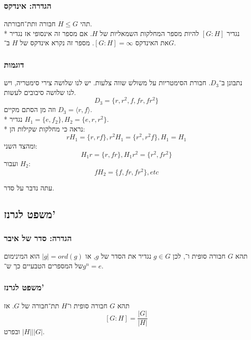 \subsubsection{הגדרה: אינדקס}
תהי $H \le G$ חבורה ותת־חבורתה. \\*
נגדיר $[G : H]$ להיות מספר המחלקות השמאליות של $H$.
אם מספר זה אינסופי אז נגדיר את האינדקס $[G : H] = \infty$.
מספר זה נקרא אינדקס של $H$ ב־$G$.

\subsubsection{דוגמות}
נתבונן ב־$D_3$.
חבורת הסימטריות על משולש שווה צלעות.
יש לנו שלושה צירי סימטריה, ויש לנו שלושה סיבובים לעשות.
\[
	D_3 = \{ r, r^2, f, fr, fr^2 \}
\]
וזה מן הסתם מקיים $D_3 = \langle r, f \rangle$. \\*
נגדיר $H_1 = \{e, f_2\}, H_2 = \{e, r, r^2\}$. \\*
נראה כי מחלקות שקילות הן:
\[
	r H_1 = \{ r, rf \},
	r^2 H_1 = \{ r^2, r^2f \},
	H_1 = H_1
\]
ומהצד השני:
\[
	H_1 r = \{ r, fr \},
	H_1 r^2 = \{ r^2, f r^2 \}
\]
ועבור $H_2$:
\[
	f H_2 = \{ f, fr, fr^2 \}, etc
\]

עתה נדבר על סדר.
\subsection{משפט לגרנז'}
\subsubsection{הגדרה: סדר של איבר}
תהא $G$ חבורה סופית ו־, לכן $g \in G$ נגדיר את הסדר של $g$, או $|g| = ord(g)$ הוא המינימום של המספרים הטבעיים כך ש־$g^n = e$.

\subsubsection{משפט לגרנז'}
תהא $G$ חבורה סופית ו־$H$ תת־חבורה של $G$. אז
\[
	[G : H] = \frac{|G|}{|H|}
\]
ובפרט $|H| \Bigg| |G|$.

